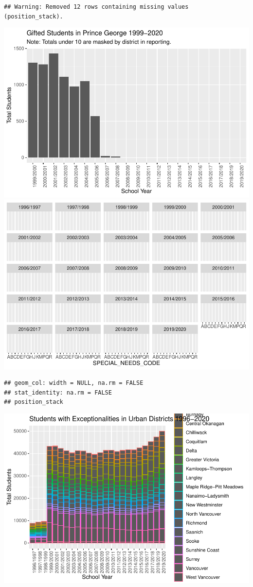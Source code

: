 \documentclass[
  english,
  man]{apa6}
\begin{document}
\begin{verbatim}
## Warning: Removed 12 rows containing missing values (position_stack).
\end{verbatim}

\includegraphics{Final_project_files/figure-latex/rural play-4.pdf} \includegraphics{Final_project_files/figure-latex/rural play-5.pdf}

\begin{verbatim}
## geom_col: width = NULL, na.rm = FALSE
## stat_identity: na.rm = FALSE
## position_stack
\end{verbatim}

\includegraphics{Final_project_files/figure-latex/urban play-1.pdf}
\end{document}
